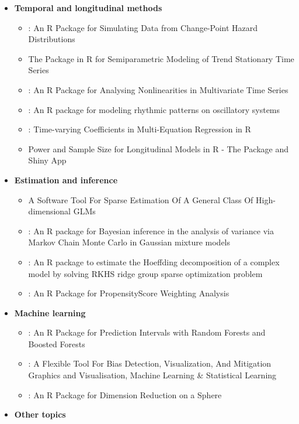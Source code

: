 \begin{itemize}
\tightlist
\item
  \textbf{Temporal and longitudinal methods}

  \begin{itemize}
  \tightlist
  \item
    : An R Package for Simulating Data from Change-Point
    Hazard Distributions
  \item
    The  Package in R for Semiparametric Modeling of Trend
    Stationary Time Series
  \item
    : An R Package for Analysing Nonlinearities in
    Multivariate Time Series
  \item
    : An R package for modeling rhythmic patterns on
    oscillatory systems
  \item
    : Time-varying Coefficients in Multi-Equation Regression
    in R
  \item
    Power and Sample Size for Longitudinal Models in R - The
     Package and Shiny App
  \end{itemize}
\item
  \textbf{Estimation and inference}

  \begin{itemize}
  \item
     A Software Tool For Sparse Estimation Of A General
    Class Of High-dimensional GLMs
  \item
    : An R package for Bayesian inference in the
    analysis of variance via Markov Chain Monte Carlo in Gaussian
    mixture models
  \item
    : An R package to estimate the Hoeffding
    decomposition of a complex model by solving RKHS ridge group sparse
    optimization problem
  \item
    : An R Package for PropensityScore Weighting Analysis
  \end{itemize}
\item
  \textbf{Machine learning}

  \begin{itemize}
  \item
    : An R Package for Prediction Intervals with
    Random Forests and Boosted Forests
  \item
    : A Flexible Tool For Bias Detection, Visualization,
    And Mitigation Graphics and Visualisation, Machine Learning \&
    Statistical Learning
  \item
    : An R Package for Dimension Reduction on a Sphere
  \end{itemize}
\item
  \textbf{Other topics}


\end{itemize}
